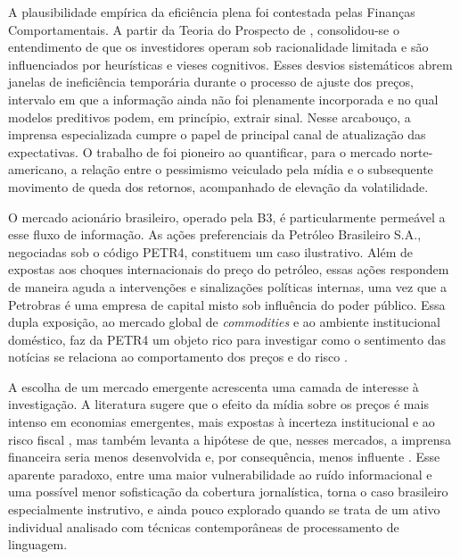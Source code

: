 A plausibilidade empírica da eficiência plena foi contestada pelas Finanças Comportamentais. A partir da Teoria do Prospecto de , consolidou-se o entendimento de que os investidores operam sob racionalidade limitada e são influenciados por heurísticas e vieses cognitivos. Esses desvios sistemáticos abrem janelas de ineficiência temporária durante o processo de ajuste dos preços, intervalo em que a informação ainda não foi plenamente incorporada e no qual modelos preditivos podem, em princípio, extrair sinal. Nesse arcabouço, a imprensa especializada cumpre o papel de principal canal de atualização das expectativas. O trabalho de  foi pioneiro ao quantificar, para o mercado norte-americano, a relação entre o pessimismo veiculado pela mídia e o subsequente movimento de queda dos retornos, acompanhado de elevação da volatilidade.

O mercado acionário brasileiro, operado pela B3, é particularmente permeável a esse fluxo de informação. As ações preferenciais da Petróleo Brasileiro S.A., negociadas sob o código PETR4, constituem um caso ilustrativo. Além de expostas aos choques internacionais do preço do petróleo, essas ações respondem de maneira aguda a intervenções e sinalizações políticas internas, uma vez que a Petrobras é uma empresa de capital misto sob influência do poder público. Essa dupla exposição, ao mercado global de \textit{commodities} e ao ambiente institucional doméstico, faz da PETR4 um objeto rico para investigar como o sentimento das notícias se relaciona ao comportamento dos preços e do risco \cite{silva_o_2018, calomiris_how_2019}.

A escolha de um mercado emergente acrescenta uma camada de interesse à investigação. A literatura sugere que o efeito da mídia sobre os preços é mais intenso em economias emergentes, mais expostas à incerteza institucional e ao risco fiscal \cite{calomiris_how_2019}, mas também levanta a hipótese de que, nesses mercados, a imprensa financeira seria menos desenvolvida e, por consequência, menos influente \cite{griffin_how_2011}. Esse aparente paradoxo, entre uma maior vulnerabilidade ao ruído informacional e uma possível menor sofisticação da cobertura jornalística, torna o caso brasileiro especialmente instrutivo, e ainda pouco explorado quando se trata de um ativo individual analisado com técnicas contemporâneas de processamento de linguagem.


